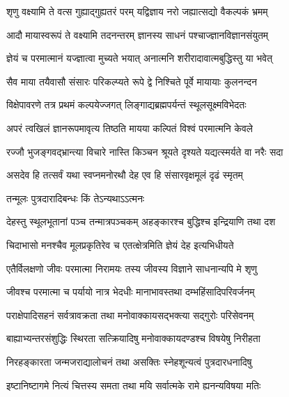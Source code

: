 


\addtocounter{shlokacount}{18}

\twolineshloka
{शृणु वक्ष्यामि ते वत्स गुह्याद्गुह्यतरं परम्}
{यद्विज्ञाय नरो जह्यात्सद्यो वैकल्पकं भ्रमम्} %

\twolineshloka
{आदौ मायास्वरूपं ते वक्ष्यामि तदनन्तरम्}
{ज्ञानस्य साधनं पश्चाज्ज्ञानविज्ञानसंयुतम्} %

\twolineshloka
{ज्ञेयं च परमात्मानं यज्ज्ञात्वा मुच्यते भयात्}
{अनात्मनि शरीरादावात्मबुद्धिस्तु या भवेत्} %

\twolineshloka
{सैव माया तयैवासौ संसारः परिकल्प्यते}
{रूपे द्वे निश्चिते पूर्वे मायायाः कुलनन्दन} %

\twolineshloka
{विक्षेपावरणे तत्र प्रथमं कल्पयेज्जगत्}
{लिङ्गाद्यब्रह्मपर्यन्तं स्थूलसूक्ष्मविभेदतः} %

\twolineshloka
{अपरं त्वखिलं ज्ञानरूपमावृत्य तिष्ठति}
{मायया कल्पितं विश्वं परमात्मनि केवले} %

\twolineshloka
{रज्जौ भुजङ्गवद्भ्रान्त्या विचारे नास्ति किञ्चन}
{श्रूयते दृश्यते यद्यत्स्मर्यते वा नरैः सदा} %

\twolineshloka
{असदेव हि तत्सर्वं यथा स्वप्नमनोरथौ}
{देह एव हि संसारवृक्षमूलं दृढं स्मृतम्} %

\onelineshloka
{तन्मूलः पुत्रदारादिबन्धः किं तेऽन्यथाऽऽत्मनः} %


\twolineshloka
{देहस्तु स्थूलभूतानां पञ्च तन्मात्रपञ्चकम्}
{अहङ्कारश्च बुद्धिश्च इन्द्रियाणि तथा दश} %

\twolineshloka
{चिदाभासो मनश्चैव मूलप्रकृतिरेव च}
{एतत्क्षेत्रमिति ज्ञेयं देह इत्यभिधीयते} %

\twolineshloka
{एतैर्विलक्षणो जीवः परमात्मा निरामयः}
{तस्य जीवस्य विज्ञाने साधनान्यपि मे शृणु} %

\twolineshloka
{जीवश्च परमात्मा च पर्यायो नात्र भेदधीः}
{मानाभावस्तथा दम्भहिंसादिपरिवर्जनम्} %

\twolineshloka
{पराक्षेपादिसहनं सर्वत्रावक्रता तथा}
{मनोवाक्कायसद्भक्त्या सद्गुरोः परिसेवनम्} %

\twolineshloka
{बाह्याभ्यन्तरसंशुद्धिः स्थिरता सत्क्रियादिषु}
{मनोवाक्कायदण्डश्च विषयेषु निरीहता} %

\twolineshloka
{निरहङ्कारता जन्मजराद्यालोचनं तथा}
{असक्तिः स्नेहशून्यत्वं पुत्रदारधनादिषु} %

\twolineshloka
{इष्टानिष्टागमे नित्यं चित्तस्य समता तथा}
{मयि सर्वात्मके रामे ह्यनन्यविषया मतिः} %

